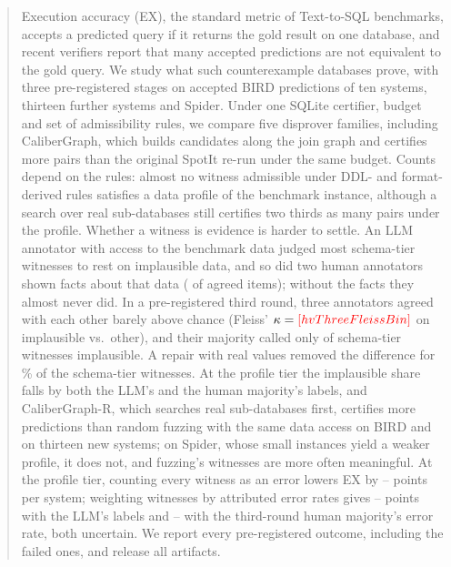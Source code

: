 \begin{abstract}
Execution accuracy (EX), the standard metric of Text-to-SQL benchmarks, accepts a predicted query if it returns the gold result on one database, and recent verifiers report that many accepted predictions are not equivalent to the gold query. We study what such counterexample databases prove, with three pre-registered stages on  accepted BIRD predictions of ten systems, thirteen further systems and Spider. Under one SQLite certifier, budget and set of admissibility rules, we compare five disprover families, including CaliberGraph, which builds candidates along the join graph and certifies more pairs than the original SpotIt re-run under the same budget. Counts depend on the rules: almost no witness admissible under DDL- and format-derived rules satisfies a data profile of the benchmark instance, although a search over real sub-databases still certifies two thirds as many pairs under the profile. Whether a witness is evidence is harder to settle. An LLM annotator with access to the benchmark data judged most schema-tier witnesses to rest on implausible data, and so did two human annotators shown facts about that data ( of  agreed items); without the facts they almost never did. In a pre-registered third round, three annotators agreed with each other barely above chance (Fleiss' $\kappa=\V{hvThreeFleissBin}$ on implausible vs.\ other), and their majority called only  of  schema-tier witnesses implausible. A repair with real values removed the difference for \,\% of the schema-tier witnesses. At the profile tier the implausible share falls by both the LLM's and the human majority's labels, and CaliberGraph-R, which searches real sub-databases first, certifies more predictions than random fuzzing with the same data access on BIRD and on thirteen new systems; on Spider, whose small instances yield a weaker profile, it does not, and fuzzing's witnesses are more often meaningful. At the profile tier, counting every witness as an error lowers EX by -- points per system; weighting witnesses by attributed error rates gives -- points with the LLM's labels and -- with the third-round human majority's error rate, both uncertain. We report every pre-registered outcome, including the failed ones, and release all artifacts.
\end{abstract}
